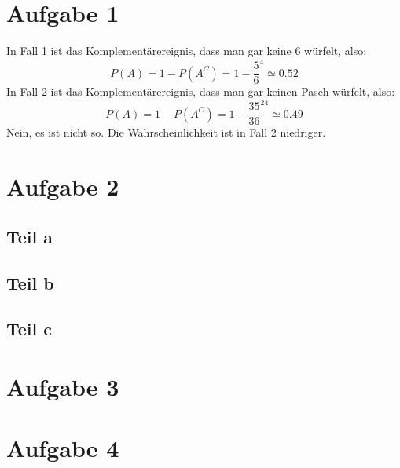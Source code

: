 \documentclass[10pt,a4paper]{article}
\begin{document}
\section{Aufgabe 1}
In Fall 1 ist das Komplementärereignis, dass man gar keine 6 würfelt, also:
\begin{equation}
  P(A) = 1 - P(A^{C}) = 1 - \frac{5}{6}^{4} \simeq 0.52 
\end{equation}
In Fall 2 ist das Komplementärereignis, dass man gar keinen Pasch würfelt, also:
\begin{equation}
  P(A) = 1 - P(A^{C}) = 1 - \frac{35}{36}^{24} \simeq 0.49
\end{equation}
Nein, es ist nicht so.
Die Wahrscheinlichkeit ist in Fall 2 niedriger.

\section{Aufgabe 2}

\subsection{Teil a}

\subsection{Teil b}

\subsection{Teil c}

\section{Aufgabe 3}

\section{Aufgabe 4}
\end{document}
